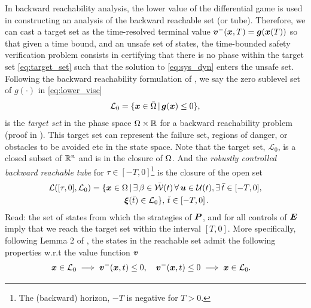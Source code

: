  In backward reachability analysis, the lower value of the differential game is used in constructing an analysis of the backward reachable set (or tube). Therefore, we can cast a target set as the time-resolved terminal value $\bm{v}^-(\bm{x}, T) = \bm{g}(\bm{x}(T))$ so that given a time bound, and an unsafe set of states, the time-bounded safety verification problem consists in certifying that there is no phase within the target set \eqref{eq:target_set} such that the solution to \eqref{eq:sys_dyn} enters the unsafe set. Following the backward reachability formulation of \citet{Mitchell2005}, we say the zero sublevel set of $g(\cdot)$ in \eqref{eq:lower_visc} \ie
 \begin{align}
 \mathcal{L}_0 = \{ \bm{x} \in \bar{\Omega} \,|\, \bm{g}(\bm{x}) \le 0 \},
 \end{align}
 is the \textit{target set} in the phase space $\Omega \times \mathbb{R}$ for a backward reachability problem (proof in \citet{Mitchell2005}). This target set can represent the failure set, regions of danger, or obstacles to be avoided etc in the state space. Note that the target set, $\mathcal{L}_0$, is a closed subset of $\mathbb{R}^n$ and is in the closure of $\Omega$. And the \textit{robustly controlled backward reachable tube} for $\tau \in [-T, 0]$\footnote{The (backward) horizon, $-T$ is negative for $T>0$.} is the closure of the open set
 \begin{align}
 \mathcal{L}([\tau, 0], \mathcal{L}_0) &= \{\state \in \openset \,| \, \exists \, \beta \in \mathcal{\bar{W}}(t) \,  \forall \, \bm{u} \in \mathcal{U}(t), \exists \, \bar{t} \in [-T, 0], \nonumber \\
 & \qquad  \qquad \bm{\xi}(\bar{t})%
 \in  \mathcal{L}_0 \}, \,\bar{t} \in \left[-T, 0\right].
 \end{align}
 Read: the set of states from which the strategies of $\bm{P}$, and for all controls of $\bm{E}$ imply that we reach the target set within the interval $[T, 0]$.   More specifically, following Lemma 2 of \citet{Mitchell2005}, the states in the reachable set admit the following properties w.r.t the value function $\bm{v}$
 \begin{subequations}
 	\begin{align}
 	\bm{x} \in \mathcal{L}_0 &\implies \bm{v}^-(\bm{x}, t) \le 0, \quad 
 	\bm{v}^-(\bm{x}, t) \le 0 \implies \bm{x} \in \mathcal{L}_0.
 	\end{align}
 \end{subequations}
 
